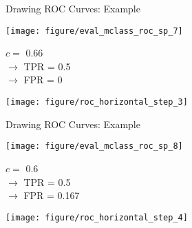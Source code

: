 \documentclass[11pt,compress,t,notes=noshow, xcolor=table]{beamer}
\begin{document}

\begin{vbframe}{Drawing ROC Curves: Example}
	
	\begin{knitrout}\scriptsize
		\color{fgcolor}
		
		{
			\texttt{[image: figure/eval\_mclass\_roc\_sp\_7]}
		}
		
	\end{knitrout}
	
	\vfill
	
	\begin{minipage}[b]{0.3\textwidth}
		$c =$ 0.66\\ 
		$\rightarrow$ TPR = 0.5 \\
		$\rightarrow$ FPR = 0
	\end{minipage}%
	\begin{minipage}[b]{0.7\textwidth}
		\texttt{[image: figure/roc\_horizontal\_step\_3]} 
	\end{minipage}
	
\end{vbframe}


\begin{vbframe}{Drawing ROC Curves: Example}
	
	\begin{knitrout}\scriptsize
		\color{fgcolor}
		
		{
			\texttt{[image: figure/eval\_mclass\_roc\_sp\_8]}
		}
		
	\end{knitrout}
	
	\vfill
	
	\begin{minipage}[b]{0.3\textwidth}
		$c =$ 0.6\\ 
		$\rightarrow$ TPR = 0.5 \\
		$\rightarrow$ FPR = 0.167
	\end{minipage}%
	\begin{minipage}[b]{0.7\textwidth}
		\texttt{[image: figure/roc\_horizontal\_step\_4]} 
	\end{minipage}
	
\end{vbframe}
\end{document}
